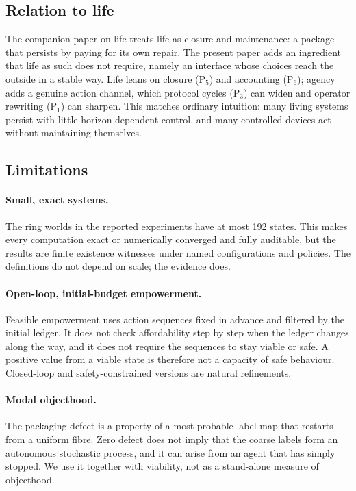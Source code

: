 \subsection{Relation to life}
The companion paper on life \citep{six_birds_life} treats life as closure and maintenance: a package that persists by paying for its own repair. The present paper adds an ingredient that life as such does not require, namely an interface whose choices reach the outside in a stable way. Life leans on closure (P$_5$) and accounting (P$_6$); agency adds a genuine action channel, which protocol cycles (P$_3$) can widen and operator rewriting (P$_1$) can sharpen. This matches ordinary intuition: many living systems persist with little horizon-dependent control, and many controlled devices act without maintaining themselves.

\subsection{Limitations}
\paragraph{Small, exact systems.}
The ring worlds in the reported experiments have at most 192 states. This makes every computation exact or numerically converged and fully auditable, but the results are finite existence witnesses under named configurations and policies. The definitions do not depend on scale; the evidence does.

\paragraph{Open-loop, initial-budget empowerment.}
Feasible empowerment uses action sequences fixed in advance and filtered by the initial ledger. It does not check affordability step by step when the ledger changes along the way, and it does not require the sequences to stay viable or safe. A positive value from a viable state is therefore not a capacity of safe behaviour. Closed-loop and safety-constrained versions are natural refinements.

\paragraph{Modal objecthood.}
The packaging defect is a property of a most-probable-label map that restarts from a uniform fibre. Zero defect does not imply that the coarse labels form an autonomous stochastic process, and it can arise from an agent that has simply stopped. We use it together with viability, not as a stand-alone measure of objecthood.

